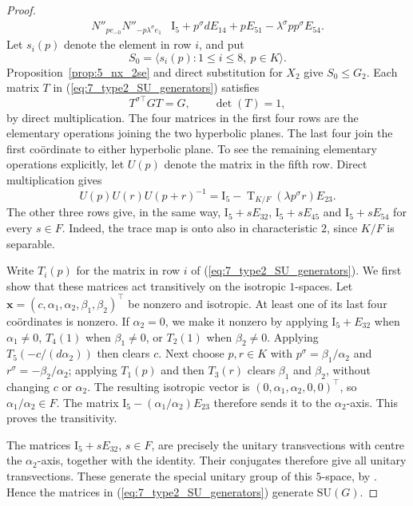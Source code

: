\documentclass{amsart}
\def\II{\mathord{\mathrm{I}}}
\newcommand{\SU}{\mathrm{SU}}
\newcommand{\Tr}{\operatorname{T}}
\newcommand{\s}{\sigma}
\newcommand{\T}{\top}
\theoremstyle{plain}
\numberwithin{theorem}{section}
\theoremstyle{definition}
\begin{document}
\begin{proof}
\begin{equation}
\begin{array}{c|c}
	N''_{p e_{-0}}N''_{-p\lambda^{\s}e_1}&
	\II_5+p^{\s}dE_{14}+pE_{51}-\lambda^{\s}pp^{\s}E_{54}.
	\end{array}
	\end{equation}
	Let $s_i(p)$ denote the element in row $i$, and put
	\begin{equation*}
		S_0=\langle s_i(p):1\leqslant i\leqslant8,\ p\in K\rangle.
	\end{equation*}
	Proposition~\ref{prop:5_nx_2se} and direct substitution for $X_2$
	give $S_0\leqslant G_2$.
	Each matrix $T$ in (\ref{eq:7_type2_SU_generators}) satisfies
	\begin{equation*}
		T^{\s\T}GT=G,\qquad \det(T)=1,
	\end{equation*}
	by direct multiplication.  The four matrices in the first four rows are the
	elementary operations joining the two hyperbolic planes.  The last four join
	the first co\"{o}rdinate to either hyperbolic plane.  To see the remaining
	elementary operations explicitly, let $U(p)$ denote the matrix in the fifth
	row.  Direct multiplication gives
	\begin{equation*}
		U(p)U(r)U(p+r)^{-1}
		=\II_5-\Tr_{K/F}(\lambda p^{\s}r)E_{23}.
	\end{equation*}
	The other three rows give, in the same way, $\II_5+sE_{32}$,
	$\II_5+sE_{45}$ and $\II_5+sE_{54}$ for every $s\in F$.  Indeed, the trace
	map is onto also in characteristic $2$, since $K/F$ is separable.

	Write $T_i(p)$ for the matrix in row $i$ of
	(\ref{eq:7_type2_SU_generators}).  We first show that these matrices act
	transitively on the isotropic $1$-spaces.  Let
	$\mathbf x=(c,\alpha_1,\alpha_2,\beta_1,\beta_2)^{\T}$ be nonzero and
	isotropic.  At least one of its last four co\"{o}rdinates is nonzero.  If
	$\alpha_2=0$, we make it nonzero by applying $\II_5+E_{32}$ when
	$\alpha_1\neq0$, $T_4(1)$ when $\beta_1\neq0$, or $T_2(1)$ when
	$\beta_2\neq0$.  Applying $T_5(-c/(d\alpha_2))$ then clears $c$.
	Next choose $p,r\in K$ with $p^{\s}=\beta_1/\alpha_2$ and
	$r^{\s}=-\beta_2/\alpha_2$; applying $T_1(p)$ and then $T_3(r)$ clears
	$\beta_1$ and $\beta_2$, without changing $c$ or $\alpha_2$.
	The resulting isotropic vector is $(0,\alpha_1,\alpha_2,0,0)^{\T}$, so
	$\alpha_1/\alpha_2\in F$.  The matrix
	$\II_5-(\alpha_1/\alpha_2)E_{23}$ therefore sends it to the
	$\alpha_2$-axis.  This proves the transitivity.

	The matrices $\II_5+sE_{32}$, $s\in F$, are precisely the unitary
	transvections with centre the $\alpha_2$-axis, together with the identity.
	Their conjugates therefore give all unitary transvections.  These generate
	the special unitary group of this $5$-space, by
	\cite[proof of Theorem~10.23]{Taylor}.  Hence the matrices in
	(\ref{eq:7_type2_SU_generators}) generate $\SU(G)$.


\end{proof}
\end{document}
